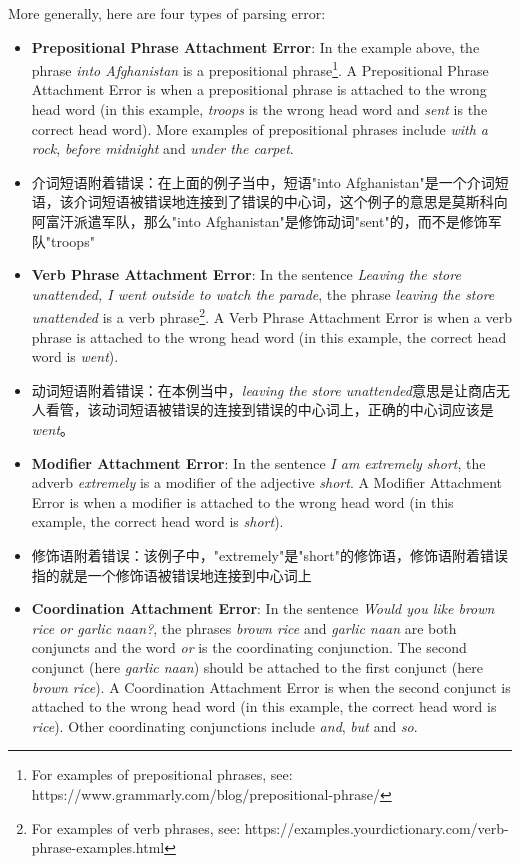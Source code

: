 \begin{parts}
More generally, here are four types of parsing error:
\begin{itemize}
    \item \textbf{Prepositional Phrase Attachment Error}: In the example above, the phrase \textit{into Afghanistan} is a prepositional phrase\footnote{For examples of prepositional phrases, see: https://www.grammarly.com/blog/prepositional-phrase/}.
    A Prepositional Phrase Attachment Error is when a prepositional phrase is attached to the wrong head word (in this example, \textit{troops} is the wrong head word and \textit{sent} is the correct head word).
    More examples of prepositional phrases include \textit{with a rock}, \textit{before midnight} and \textit{under the carpet}. 
    \item 介词短语附着错误：在上面的例子当中，短语"into Afghanistan"是一个介词短语，该介词短语被错误地连接到了错误的中心词，这个例子的意思是莫斯科向阿富汗派遣军队，那么"into Afghanistan"是修饰动词"sent"的，而不是修饰军队"troops"
    \item \textbf{Verb Phrase Attachment Error}: In the sentence \textit{Leaving the store unattended, I went outside to watch the parade}, the phrase \textit{leaving the store unattended} is a verb phrase\footnote{For examples of verb phrases, see: https://examples.yourdictionary.com/verb-phrase-examples.html}. 
    A Verb Phrase Attachment Error is when a verb phrase is attached to the wrong head word (in this example, the correct head word is \textit{went}).
    \item 动词短语附着错误：在本例当中，\textit{leaving the store unattended}意思是让商店无人看管，该动词短语被错误的连接到错误的中心词上，正确的中心词应该是\textit{went}。
    \item \textbf{Modifier Attachment Error}: In the sentence \textit{I am extremely short}, the adverb \textit{extremely} is a modifier of the adjective \textit{short}. A Modifier Attachment Error is when a modifier is attached to the wrong head word (in this example, the correct head word is \textit{short}).
    \item 修饰语附着错误：该例子中，"extremely"是"short"的修饰语，修饰语附着错误指的就是一个修饰语被错误地连接到中心词上
    \item \textbf{Coordination Attachment Error}: In the sentence \textit{Would you like brown rice or garlic naan?}, the phrases \textit{brown rice} and \textit{garlic naan} are both conjuncts and the word \textit{or} is the coordinating conjunction. The second conjunct (here \textit{garlic naan}) should be attached to the first conjunct (here \textit{brown rice}). A Coordination Attachment Error is when the second conjunct is attached to the wrong head word (in this example, the correct head word is \textit{rice}). Other coordinating conjunctions include \textit{and}, \textit{but} and \textit{so}.

\end{itemize}
\end{parts}
